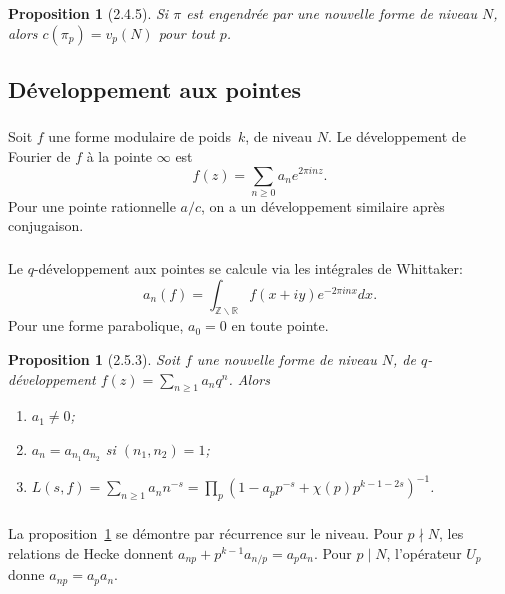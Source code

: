 \documentclass[11pt,a4paper]{amsart}
\theoremstyle{plain}
\newtheorem{proposition}[theorem]{Proposition}
\theoremstyle{definition}
\theoremstyle{remark}
\newcommand{\ZZ}{\mathbb{Z}}
\newcommand{\RR}{\mathbb{R}}
\newcommand{\bs}{\backslash}
\begin{document}
\begin{proposition}[2.4.5] \label{prop:2.4.5}
Si $\pi$ est engendr\'ee par une nouvelle forme de niveau $N$, alors $c(\pi_p) = v_p(N)$ pour tout $p$.
\end{proposition}

\subsection{D\'eveloppement aux pointes}

\subsubsection{}
\label{sec:2.5.1}

Soit $f$ une forme modulaire de poids~$k$, de niveau $N$. Le d\'eveloppement de Fourier de $f$ \`a la pointe $\infty$ est
\[ f(z) = \sum_{n \geq 0} a_n e^{2\pi i n z}. \]
Pour une pointe rationnelle $a/c$, on a un d\'eveloppement similaire apr\`es conjugaison.

\subsubsection{}
\label{sec:2.5.2}

Le $q$-d\'eveloppement aux pointes se calcule via les int\'egrales de Whittaker:
\[ a_n(f) = \int_{\ZZ\bs\RR} f(x+iy) e^{-2\pi i n x} dx. \]
Pour une forme parabolique, $a_0 = 0$ en toute pointe.

\begin{proposition}[2.5.3] \label{prop:2.5.3}
Soit $f$ une nouvelle forme de niveau $N$, de $q$-d\'eveloppement $f(z) = \sum_{n \geq 1} a_n q^n$. Alors
\begin{enumerate}
\item[(i)] $a_1 \neq 0$;
\item[(ii)] $a_n = a_{n_1} a_{n_2}$ si $(n_1,n_2) = 1$;
\item[(iii)] $L(s,f) = \sum_{n \geq 1} a_n n^{-s} = \prod_p (1 - a_p p^{-s} + \chi(p) p^{k-1-2s})^{-1}$.
\end{enumerate}
\end{proposition}

\subsubsection{}
\label{sec:2.5.4}

La proposition~\ref{prop:2.5.3} se d\'emontre par r\'ecurrence sur le niveau. Pour $p \nmid N$, les relations de Hecke donnent $a_{np} + p^{k-1} a_{n/p} = a_p a_n$. Pour $p \mid N$, l'op\'erateur $U_p$ donne $a_{np} = a_p a_n$.
\end{document}

